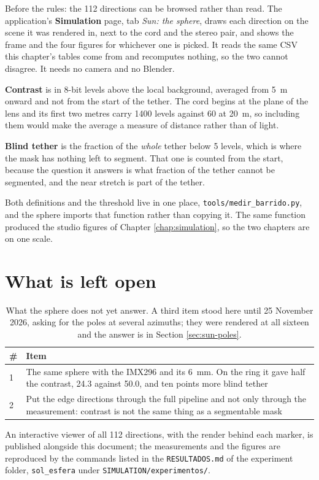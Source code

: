 Before the rules: the 112 directions can be browsed rather than read. The
application's \textbf{Simulation} page, tab \emph{Sun: the sphere}, draws each
direction on the scene it was rendered in, next to the cord and the stereo
pair, and shows the frame and the four figures for whichever one is picked.
It reads the same CSV this chapter's tables come from and recomputes
nothing, so the two cannot disagree. It needs no camera and no Blender.


\textbf{Contrast} is in 8-bit levels above the local background, averaged
from 5~m onward and not from the start of the tether. The cord begins at the
plane of the lens and its first two metres carry 1400 levels against 60 at
20~m, so including them would make the average a measure of distance rather
than of light.

\textbf{Blind tether} is the fraction of the \emph{whole} tether below 5
levels, which is where the mask has nothing left to segment. That one is
counted from the start, because the question it answers is what fraction of
the tether cannot be segmented, and the near stretch is part of the tether.

Both definitions and the threshold live in one place,
\texttt{tools/medir\_barrido.py}, and the sphere imports that function rather
than copying it. The same function produced the studio figures of Chapter
\ref{chap:simulation}, so the two chapters are on one scale.

\section{What is left open}

\begin{table}[htbp]
\centering
\caption[Open items from the sphere]{What the sphere does not yet answer.
A third item stood here until 25 November 2026, asking for the poles at
several azimuths; they were rendered at all sixteen and the answer is in
Section \ref{sec:sun-poles}.}
\label{tab:sun-open}
\begin{tabularx}{\textwidth}{@{}l X@{}}
\toprule
\textbf{\#} & \textbf{Item} \\
\midrule
1 & The same sphere with the IMX296 and its 6~mm. On the ring it gave half
    the contrast, 24.3 against 50.0, and ten points more blind tether \\
2 & Put the edge directions through the full pipeline and not only through
    the measurement: contrast is not the same thing as a segmentable mask \\
\bottomrule
\end{tabularx}
\end{table}

An interactive viewer of all 112 directions, with the render behind each
marker, is published alongside this document; the measurements and the
figures are reproduced by the commands listed in the
\texttt{RESULTADOS.md} of the experiment folder, \texttt{sol\_esfera} under
\texttt{SIMULATION/experimentos/}.
